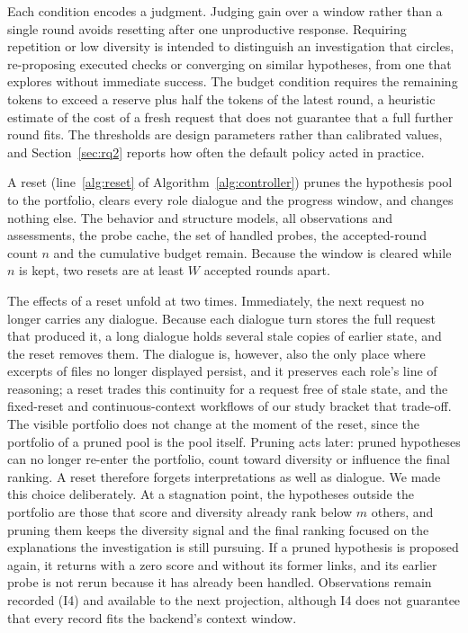 \documentclass[a4paper,fleqn]{cas-sc}
\begin{document}
Each condition encodes a judgment. Judging gain over a window rather than a single round avoids resetting after one unproductive response. Requiring repetition or low diversity is intended to distinguish an investigation that circles, re-proposing executed checks or converging on similar hypotheses, from one that explores without immediate success. The budget condition requires the remaining tokens to exceed a reserve plus half the tokens of the latest round, a heuristic estimate of the cost of a fresh request that does not guarantee that a full further round fits. The thresholds are design parameters rather than calibrated values, and Section~\ref{sec:rq2} reports how often the default policy acted in practice.

A reset (line~\ref{alg:reset} of Algorithm~\ref{alg:controller}) prunes the hypothesis pool to the portfolio, clears every role dialogue and the progress window, and changes nothing else. The behavior and structure models, all observations and assessments, the probe cache, the set of handled probes, the accepted-round count $n$ and the cumulative budget remain. Because the window is cleared while $n$ is kept, two resets are at least $W$ accepted rounds apart.

The effects of a reset unfold at two times. Immediately, the next request no longer carries any dialogue. Because each dialogue turn stores the full request that produced it, a long dialogue holds several stale copies of earlier state, and the reset removes them. The dialogue is, however, also the only place where excerpts of files no longer displayed persist, and it preserves each role's line of reasoning; a reset trades this continuity for a request free of stale state, and the fixed-reset and continuous-context workflows of our study bracket that trade-off. The visible portfolio does not change at the moment of the reset, since the portfolio of a pruned pool is the pool itself. Pruning acts later: pruned hypotheses can no longer re-enter the portfolio, count toward diversity or influence the final ranking. A reset therefore forgets interpretations as well as dialogue. We made this choice deliberately. At a stagnation point, the hypotheses outside the portfolio are those that score and diversity already rank below $m$ others, and pruning them keeps the diversity signal and the final ranking focused on the explanations the investigation is still pursuing. If a pruned hypothesis is proposed again, it returns with a zero score and without its former links, and its earlier probe is not rerun because it has already been handled. Observations remain recorded (I4) and available to the next projection, although I4 does not guarantee that every record fits the backend's context window.
\end{document}
